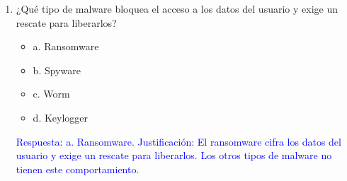 \documentclass[a4paper]{article}
\begin{document}
\begin{enumerate}
    \item ¿Qué tipo de malware bloquea el acceso a los datos del usuario y exige un rescate para liberarlos? 
    \begin{itemize}
        \item a. Ransomware
        \item b. Spyware
        \item c. Worm
        \item d. Keylogger
    \end{itemize}
    \textcolor{blue}{Respuesta: a. Ransomware. Justificación: El ransomware cifra los datos del usuario y exige un rescate para liberarlos. Los otros tipos de malware no tienen este comportamiento.}
    \vspace{1cm}
    
    
    

\end{enumerate}
\end{document}
